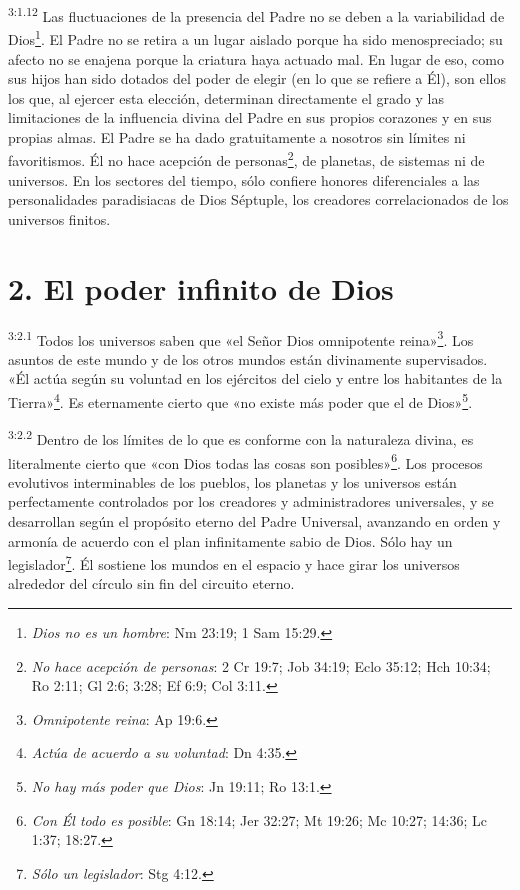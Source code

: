 \par
\textsuperscript{3:1.12} Las fluctuaciones de la presencia del Padre no se deben a la variabilidad de Dios\footnote{\textit{Dios no es un hombre}: Nm 23:19; 1 Sam 15:29.}. El Padre no se retira a un lugar aislado porque ha sido menospreciado; su afecto no se enajena porque la criatura haya actuado mal. En lugar de eso, como sus hijos han sido dotados del poder de elegir (en lo que se refiere a Él), son ellos los que, al ejercer esta elección, determinan directamente el grado y las limitaciones de la influencia divina del Padre en sus propios corazones y en sus propias almas. El Padre se ha dado gratuitamente a nosotros sin límites ni favoritismos. Él no hace acepción de personas\footnote{\textit{No hace acepción de personas}: 2 Cr 19:7; Job 34:19; Eclo 35:12; Hch 10:34; Ro 2:11; Gl 2:6; 3:28; Ef 6:9; Col 3:11.}, de planetas, de sistemas ni de universos. En los sectores del tiempo, sólo confiere honores diferenciales a las personalidades paradisiacas de Dios Séptuple, los creadores correlacionados de los universos finitos.

\section*{2. El poder infinito de Dios}
\par
\textsuperscript{3:2.1} Todos los universos saben que «el Señor Dios omnipotente reina»\footnote{\textit{Omnipotente reina}: Ap 19:6.}. Los asuntos de este mundo y de los otros mundos están divinamente supervisados. «Él actúa según su voluntad en los ejércitos del cielo y entre los habitantes de la Tierra»\footnote{\textit{Actúa de acuerdo a su voluntad}: Dn 4:35.}. Es eternamente cierto que «no existe más poder que el de Dios»\footnote{\textit{No hay más poder que Dios}: Jn 19:11; Ro 13:1.}.

\par
\textsuperscript{3:2.2} Dentro de los límites de lo que es conforme con la naturaleza divina, es literalmente cierto que «con Dios todas las cosas son posibles»\footnote{\textit{Con Él todo es posible}: Gn 18:14; Jer 32:27; Mt 19:26; Mc 10:27; 14:36; Lc 1:37; 18:27.}. Los procesos evolutivos interminables de los pueblos, los planetas y los universos están perfectamente controlados por los creadores y administradores universales, y se desarrollan según el propósito eterno del Padre Universal, avanzando en orden y armonía de acuerdo con el plan infinitamente sabio de Dios. Sólo hay un legislador\footnote{\textit{Sólo un legislador}: Stg 4:12.}. Él sostiene los mundos en el espacio y hace girar los universos alrededor del círculo sin fin del circuito eterno.

